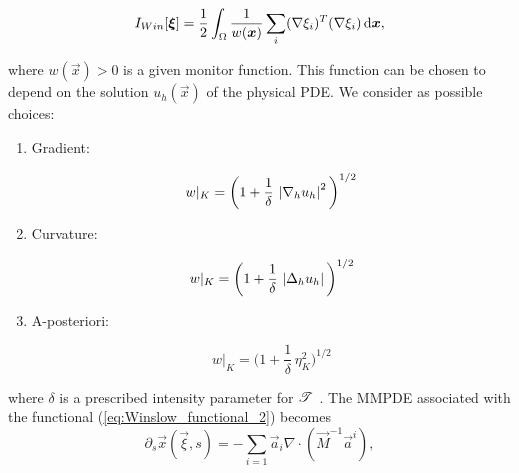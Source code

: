 \documentclass[a4paper,11pt]{article}
\begin{document}
\begin{equation}
    I_{Win}[\boldsymbol \xi] = \frac{1}{2} \int_{\Omega} \frac{1}{ w(\boldsymbol x)} \sum_{i} (\nabla \xi_{i})^{T} (\nabla \xi_{i}) \,\mathrm{d} \boldsymbol x,
\label{eq:Winslow_functional_2}
\end{equation}

where $w(\vec{x}) > 0$ is a given monitor function. This function can be chosen to depend on the solution $u_{h}(\vec{x})$ of the physical PDE. We consider as possible choices:

\begin{enumerate}
    \item Gradient:
    
    \begin{equation}
          w|_{K} = \bigg( 1 + \frac{1}{\delta} \, \left|\nabla_{h} u_{h}\right|^{2} \bigg)^{1/2}
    \label{eq:monitor_gradient}
    \end{equation}
    
    
    \item Curvature:
    
    \begin{equation}
        w|_{K} = \bigg( 1 +  \frac{1}{\delta} \,\left|\Delta_{h}u_{h}\right|\bigg)^{1/2}
    \label{eq:monitor_curvature}
    \end{equation}
    
    \item A-posteriori:  
    
    \begin{equation}
        w|_{K} = \bigg( 1 +  \frac{1}{\delta} \, \eta^{2}_{K}\bigg)^{1/2}
    \label{eq:monitor_posteriori}
    \end{equation}

\end{enumerate}


where $\delta$ is a prescribed intensity parameter for $\mathscr T^{}$
\cite{HR:2011,BHR:2009}. The MMPDE associated with the functional (\ref{eq:Winslow_functional_2})
becomes
\begin{equation}
  \partial_s \vec{x} (\vec \xi ,s)
  =
  - \sum_{i=1} \vec{a}_{i} \nabla \cdot (\vec M^{-1}\vec{a}^{i}),
\label{eq:MMPDE_Winslow}
\end{equation}
\end{document}
